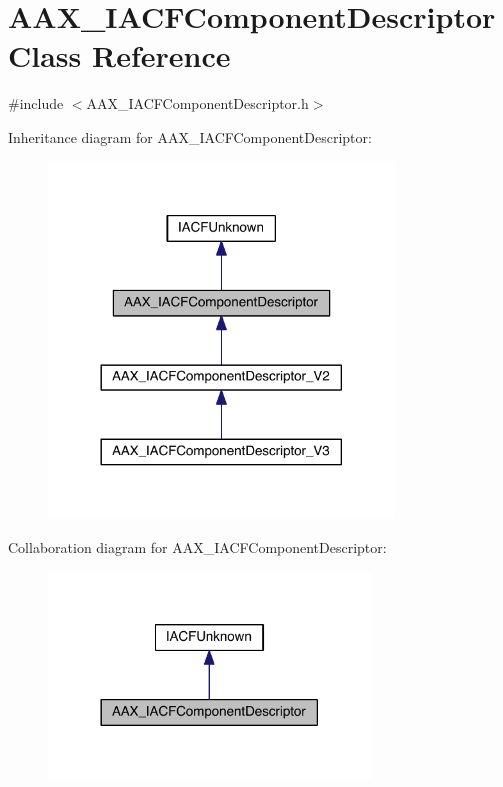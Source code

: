 \hypertarget{a00050}{}\section{A\+A\+X\+\_\+\+I\+A\+C\+F\+Component\+Descriptor Class Reference}
\label{a00050}


{\ttfamily \#include $<$A\+A\+X\+\_\+\+I\+A\+C\+F\+Component\+Descriptor.\+h$>$}



Inheritance diagram for A\+A\+X\+\_\+\+I\+A\+C\+F\+Component\+Descriptor\+:
\nopagebreak
\begin{figure}[H]
\begin{center}
\leavevmode
\includegraphics[width=260pt]{a00493}
\end{center}
\end{figure}


Collaboration diagram for A\+A\+X\+\_\+\+I\+A\+C\+F\+Component\+Descriptor\+:
\nopagebreak
\begin{figure}[H]
\begin{center}
\leavevmode
\includegraphics[width=242pt]{a00494}
\end{center}
\end{figure}


